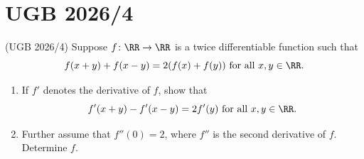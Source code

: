 \documentclass[numbers=endperiod, 11pt]{scrartcl}
\begin{document}
\section{UGB 2026/4}

\begin{prob}{(UGB 2026/4)}{}
    Suppose $f\colon \RR \to \RR$ is a twice
    differentiable function such that
    \[f(x + y) + f(x - y) = 2(f(x) + f(y)) \text{ for all } x, y \in \RR.\]
    \begin{enumerate}[label=\alph*)]
        \item If $f'$ denotes the derivative of $f$,
              show that
              \[f'(x + y) - f'(x - y) = 2f'(y) \text{ for all } x, y \in \RR.\]
        \item Further assume that $f''(0) = 2$, where
              $f''$ is the second derivative of $f$.
              Determine $f$.
    \end{enumerate}
\end{prob}
\end{document}
